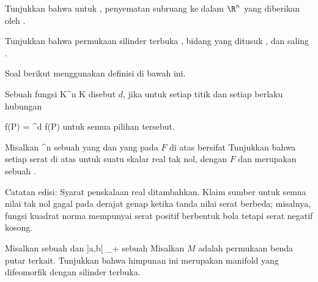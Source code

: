 {}
{

Tunjukkan bahwa untuk
, penyematan subruang
 ke dalam $\R^n$ yang diberikan oleh
.

}
{} {}

{}
{

Tunjukkan bahwa permukaan silinder terbuka
\mathl{S^1 \times {]0,1[}}{},
 bidang yang ditusuk
, dan
saling .

}
{} {}

Soal berikut menggunakan definisi di bawah ini.

Sebuah fungsi
 { {\mathbb K}^n } { {\mathbb K}
} {}
disebut
$d$, jika untuk setiap titik
 dan setiap
 berlaku hubungan

\mavergleichskettedisp
{\vergleichskette
{f(\lambda P)
}
{ =} { \lambda^d f(P)
}
{ } {
}
{ } {
}
{ } {
}
}
{}{}{}
untuk semua pilihan tersebut.

{}
{

Misalkan
 {\R^n } {\R
} {}
sebuah
 yang
dan yang pada
$F$ di atas
bersifat 
Tunjukkan bahwa setiap serat di atas
untuk suatu skalar real tak nol,
 dengan $F$ dan merupakan sebuah
.

Catatan edisi: Syarat penskalaan real ditambahkan. Klaim sumber untuk semua nilai tak nol gagal pada derajat genap ketika tanda nilai serat berbeda; misalnya, fungsi kuadrat norma mempunyai serat positif berbentuk bola tetapi serat negatif kosong.

}
{} {}

{}
{

Misalkan
\mathl{]a,b[}{} sebuah
dan
 {]a,b[} {\R_{+}
} {}
sebuah
Misalkan $M$ adalah permukaan benda putar terkait. Tunjukkan bahwa himpunan ini merupakan manifold yang difeomorfik dengan silinder terbuka.

}
{} {}

